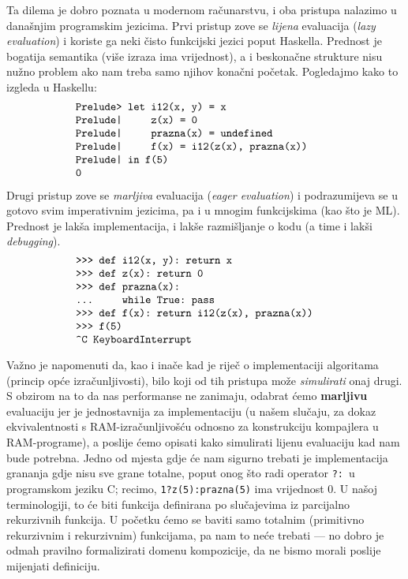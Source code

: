 Ta dilema je dobro poznata u modernom računarstvu, i oba pristupa nalazimo u današnjim programskim jezicima. Prvi pristup zove se \emph{lijena} evaluacija (\emph{lazy evaluation}) i koriste ga neki čisto funkcijski jezici poput Haskella. Prednost je bogatija semantika (više izraza ima vrijednost), a i beskonačne strukture nisu nužno problem ako nam treba samo njihov konačni početak. Pogledajmo kako to izgleda u Haskellu:
\begin{equation}\begin{minipage}{0.8\textwidth}
\begin{verbatim}
    Prelude> let i12(x, y) = x
    Prelude|     z(x) = 0
    Prelude|     prazna(x) = undefined
    Prelude|     f(x) = i12(z(x), prazna(x))
    Prelude| in f(5)
    0
\end{verbatim}
\end{minipage}\end{equation}

Drugi pristup zove se \emph{marljiva} evaluacija (\emph{eager evaluation}) i podrazumijeva se u gotovo svim imperativnim jezicima, pa i u mnogim funkcijskima (kao što je ML\@). Prednost je lakša implementacija, i lakše razmišljanje o kodu (a time i lakši \emph{debugging}). %
\begin{equation}\begin{minipage}{0.8\textwidth}
\begin{verbatim}
    >>> def i12(x, y): return x
    >>> def z(x): return 0
    >>> def prazna(x):
    ...     while True: pass
    >>> def f(x): return i12(z(x), prazna(x))
    >>> f(5)
    ^C KeyboardInterrupt
\end{verbatim}
\end{minipage}\end{equation}

Važno je napomenuti da, kao i inače kad je riječ o implementaciji algoritama (princip opće izračunljivosti), bilo koji od tih pristupa može \emph{simulirati} onaj drugi. S obzirom na to da nas performanse ne zanimaju, odabrat ćemo \textbf{marljivu} evaluaciju jer je jednostavnija za implementaciju (u našem slučaju, za dokaz ekvivalentnosti s RAM-izračunljivošću odnosno za konstrukciju kompajlera u RAM-programe), a poslije ćemo opisati kako simulirati lijenu evaluaciju kad nam bude potrebna. Jedno od mjesta gdje će nam sigurno trebati je implementacija grananja gdje nisu sve grane totalne, poput onog što radi operator \texttt{?:}\ u programskom jeziku C; recimo, \texttt{1?z(5):prazna(5)} ima vrijednost $0$. U našoj terminologiji, to će biti funkcija definirana po slučajevima iz parcijalno rekurzivnih funkcija. U početku ćemo se baviti samo totalnim (primitivno rekurzivnim i rekurzivnim) funkcijama, pa nam to neće trebati --- no dobro je odmah pravilno formalizirati domenu kompozicije, da ne bismo morali poslije mijenjati definiciju.

